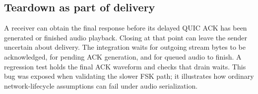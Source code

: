 \subsection{Teardown as part of delivery}
A receiver can obtain the final response before its delayed QUIC ACK has been
generated or finished audio playback. Closing at that point can leave the
sender uncertain about delivery. The integration waits for outgoing stream
bytes to be acknowledged, for pending ACK generation, and for queued audio
to finish. A regression test holds the final ACK waveform and checks that
drain waits. This bug was exposed when validating the slower FSK path; it
illustrates how ordinary network-lifecycle assumptions can fail under audio
serialization.
